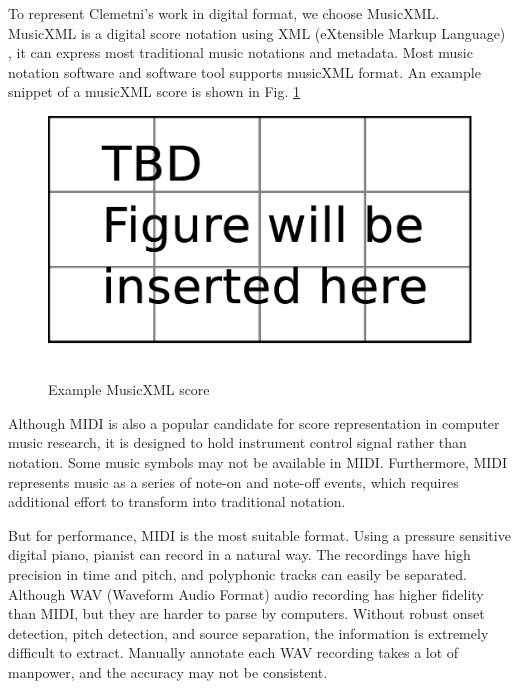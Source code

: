To represent Clemetni's work in digital format, we choose MusicXML. MusicXML is a digital score notation using XML (eXtensible Markup Language) , it can express most traditional music notations and metadata. Most music notation software and software tool supports musicXML format. An example snippet of a musicXML score is shown in Fig. \ref{fig:expxml}%
\begin{figure}[tp]
   \begin{center}
      \includegraphics[width=\textwidth]{fig/TBDFigure}

   \end{center}
   \caption{Example MusicXML score}
   \label{fig:expxml}
\end{figure}
Although MIDI is also a popular candidate for score representation in computer music research, it is designed to hold instrument control signal rather than notation. Some music symbols may not be available in MIDI. Furthermore, MIDI represents music as a series of note-on and note-off events, which requires additional effort to transform into traditional notation.

But for performance, MIDI is the most suitable format. Using a pressure sensitive digital piano, pianist can record in a natural way. The recordings have high precision in time and pitch, and polyphonic tracks can easily be separated. Although WAV (Waveform Audio Format) audio recording has higher fidelity than MIDI, but they are harder to parse by computers. Without robust onset detection, pitch detection, and source separation, the information is extremely difficult to extract.  Manually annotate each WAV recording takes a lot of manpower, and the accuracy may not be consistent. 

